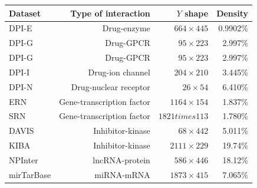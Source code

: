 \begin{table}[tb]
    \centering
    \footnotesize
    \begin{tabular}{lrrr}%
        \toprule
        Dataset & Type of interaction & $Y$ shape & Density\\%
        \midrule
        DPI-E & Drug-enzyme & $664 \times 445$ & 0.9902\%\\%
        DPI-G & Drug-GPCR & $95 \times 223$ & 2.997\%\\%
        DPI-G & Drug-GPCR & $95 \times 223$ & 2.997\%\\%
        DPI-I & Drug-ion channel & $204 \times 210$ & 3.445\%\\%
        DPI-N & Drug-nuclear receptor & $26 \times 54$ & 6.410\%\\%
        ERN & Gene-transcription factor & $1164 \times 154$ & 1.837\%\\%
        SRN & Gene-transcription factor & $1821 times 113$ & 1.780\%\\%
        DAVIS & Inhibitor-kinase & $68 \times 442$ & 5.011\%\\%
        KIBA & Inhibitor-kinase & $2111 \times 229$ & 19.74\%\\%
        NPInter & lncRNA-protein & $586 \times 446$ & 18.12\%\\%
        mirTarBase & miRNA-mRNA & $1873 \times 415$ & 7.065\%\\%

\end{tabular}
\end{table}
